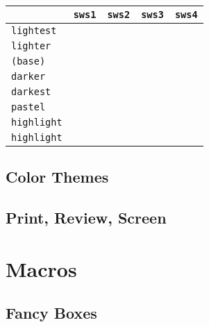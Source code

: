 \documentclass{swsthesis}
\begin{document}
	\begin{center}
		\begin{tabular}{lcccc}
			& \texttt{sws1} & \texttt{sws2} & \texttt{sws3} & \texttt{sws4}\\
			\midrule
			\texttt{lightest}& \cellcolor{sws1-lightest} &\cellcolor{sws2-lightest}&\cellcolor{sws3-lightest}&\cellcolor{sws4-lightest} \\
			
			\texttt{lighter}& \cellcolor{sws1-lighter} &\cellcolor{sws2-lighter}&\cellcolor{sws3-lighter}&\cellcolor{sws4-lighter} \\
			
			\texttt{(base)}& \cellcolor{sws1} &\cellcolor{sws2}&\cellcolor{sws3}&\cellcolor{sws4} \\
			\texttt{darker}& \cellcolor{sws1-darker} &\cellcolor{sws2-darker}&\cellcolor{sws3-darker}&\cellcolor{sws4-darker} \\
			
			\texttt{darkest}& \cellcolor{sws1-darkest} &\cellcolor{sws2-darkest}&\cellcolor{sws3-darkest}&\cellcolor{sws4-darkest} \\	
			\midrule
			\texttt{pastel}& \cellcolor{sws1-lightest!25} &\cellcolor{sws2-lightest!25}&\cellcolor{sws3-lightest!25}&\cellcolor{sws4-lightest!25} \\
			\texttt{highlight}& \cellcolor{sws1-lightest!15} &\cellcolor{sws2-lightest!15} &\cellcolor{sws3-lightest!15}& \cellcolor{sws4-lightest!15}\\
			\texttt{highlight}& \cellcolor{sws1-lightest!5} &\cellcolor{sws2-lightest!5} &\cellcolor{sws3-lightest!5}& \cellcolor{sws4-lightest!5}\\
			\midrule	
		\end{tabular}
	\end{center}
	
	\section{Color Themes}
	\section{Print, Review, Screen}
	
	\chapter{Macros}
	
	
	\section{Fancy Boxes}
	
	
	
	\backmatter
	\AtNextBibliography{}
	\printbibliography[heading=bibintoc]
	
\end{document}
